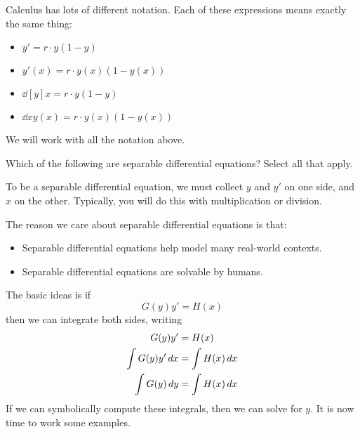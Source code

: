 \documentclass{ximera}
\begin{document}
\begin{warning}
  Calculus has lots of different notation. Each of these expressions
  means exactly the same thing:
  \begin{itemize}
  \item $y' = r\cdot y(1-y)$
  \item $y'(x) = r\cdot y(x)(1-y(x))$
  \item $\dd[y]{x} = r \cdot y(1-y)$
  \item $\dd{x} y(x) = r\cdot y(x) (1-y(x))$
  \end{itemize}
  We will work with all the notation above.
\end{warning}

\begin{question}
  Which of the following are separable differential equations?  Select all that apply.
  \begin{selectAll}
  \end{selectAll}
  \begin{hint}
    To be a separable differential equation, we must collect $y$ and
    $y'$ on one side, and $x$ on the other. Typically, you will do
    this with multiplication or division.
  \end{hint}
\end{question}

The reason we care about separable differential equations is that:
\begin{itemize}
\item Separable differential equations help model many real-world contexts.
\item Separable differential equations are solvable by humans.
\end{itemize}
The basic ideas is if
\[
G(y)y' = H(x)
\]
then we can integrate both sides, writing
\begin{align*}
  G(y)y'  &= H(x)\\
  \int G(y) y' \mathop{}\!d x &= \int H(x) \mathop{}\!d x\\
  \int G(y) \mathop{}\!d y &= \int H(x) \mathop{}\!d x
\end{align*}
If we can symbolically compute these integrals, then we can solve for
$y$. It is now time to work some examples. 
\end{document}
